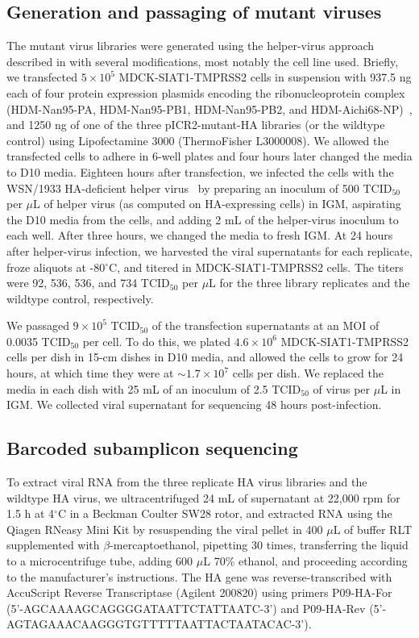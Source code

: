 \documentclass[9pt,twocolumn,twoside]{pnas-new-for-biorxiv}
\begin{document}
{\subsection*{Generation and passaging of mutant viruses}
The mutant virus libraries were generated using the helper-virus approach described in \cite{doud2016accurate} with several modifications, most notably the cell line used.
Briefly, we transfected $5 \times 10^5$ MDCK-SIAT1-TMPRSS2 cells in suspension with 937.5 ng each of four protein expression plasmids encoding the ribonucleoprotein complex (HDM-Nan95-PA, HDM-Nan95-PB1, HDM-Nan95-PB2, and HDM-Aichi68-NP)~\cite{gong2013stability}, and 1250 ng of one of the three pICR2-mutant-HA libraries (or the wildtype control) using Lipofectamine 3000 (ThermoFisher L3000008).
We allowed the transfected cells to adhere in 6-well plates and four hours later changed the media to D10 media.
Eighteen hours after transfection, we infected the cells with the WSN/1933 HA-deficient helper virus~\cite{doud2016accurate} by preparing an inoculum of 500 TCID$_{50}$ per $\mu$L of helper virus (as computed on HA-expressing cells) in IGM, aspirating the D10 media from the cells, and adding 2 mL of the helper-virus inoculum to each well.
After three hours, we changed the media to fresh IGM.
At 24 hours after helper-virus infection, we harvested the viral supernatants for each replicate, froze aliquots at -80$^{\circ}$C, and titered in MDCK-SIAT1-TMPRSS2 cells.
The titers were 92, 536, 536, and 734 TCID$_{50}$ per $\mu$L for the three library replicates and the wildtype control, respectively.

We passaged $9 \times 10^5$ TCID$_{50}$ of the transfection supernatants at an MOI of 0.0035 TCID$_{50}$ per cell.
To do this, we plated $4.6 \times 10^6$ MDCK-SIAT1-TMPRSS2 cells per dish in 15-cm dishes in D10 media, and allowed the cells to grow for 24 hours, at which time they were at $\sim 1.7 \times 10^7$ cells per dish.
We replaced the media in each dish with 25 mL of an inoculum of 2.5 TCID$_{50}$ of virus per $\mu$L in IGM.
We collected viral supernatant for sequencing 48 hours post-infection.

\subsection*{Barcoded subamplicon sequencing}
To extract viral RNA from the three replicate HA virus libraries and the wildtype HA virus, we ultracentrifuged 24 mL of supernatant at 22,000 rpm for 1.5 h at 4$^{\circ}$C in a Beckman Coulter SW28 rotor, and extracted RNA using the Qiagen RNeasy Mini Kit by resuspending the viral pellet in 400 $\mu$L of buffer RLT supplemented with $\beta$-mercaptoethanol, pipetting 30 times, transferring the liquid to a microcentrifuge tube, adding 600 $\mu$L 70\% ethanol, and proceeding according to the manufacturer's instructions.
The HA gene was reverse-transcribed with AccuScript Reverse Transcriptase (Agilent 200820) using primers P09-HA-For (5'-AGCAAAAGCAGGGGATAATTCTATTAATC-3') and P09-HA-Rev (5'-AGTAGAAACAAGGGTGTTTTTAATTACTAATACAC-3').

}
\end{document}
